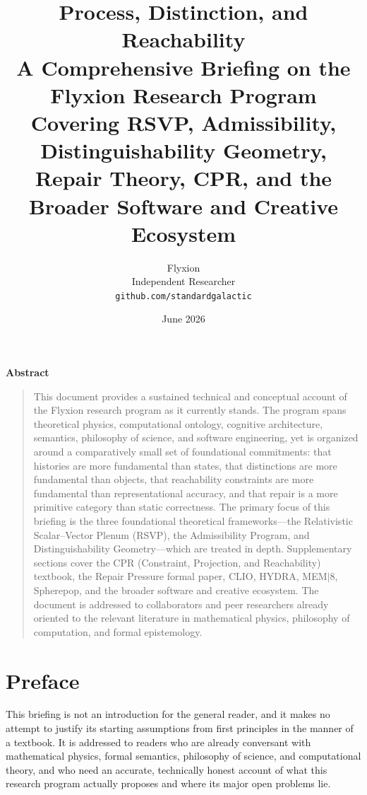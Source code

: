 \documentclass[11pt, oneside]{book}
\title{%
  \textbf{Process, Distinction, and Reachability}\\[0.6em]
  \large A Comprehensive Briefing on the Flyxion Research Program\\[0.3em]
  \normalsize Covering RSVP, Admissibility, Distinguishability Geometry,\\
  Repair Theory, CPR, and the Broader Software and Creative Ecosystem
}
\author{Flyxion \\ \small Independent Researcher \\ \small \texttt{github.com/standardgalactic}}
\date{June 2026}
\theoremstyle{definition}
\theoremstyle{remark}
\begin{document}
\frontmatter
\maketitle
\thispagestyle{empty}

\vspace{2em}
\begin{center}
\large\textbf{Abstract}
\end{center}
\begin{quote}
\noindent
This document provides a sustained technical and conceptual account of the Flyxion research program as it currently stands. The program spans theoretical physics, computational ontology, cognitive architecture, semantics, philosophy of science, and software engineering, yet is organized around a comparatively small set of foundational commitments: that histories are more fundamental than states, that distinctions are more fundamental than objects, that reachability constraints are more fundamental than representational accuracy, and that repair is a more primitive category than static correctness. The primary focus of this briefing is the three foundational theoretical frameworks—the Relativistic Scalar–Vector Plenum (RSVP), the Admissibility Program, and Distinguishability Geometry—which are treated in depth. Supplementary sections cover the CPR (Constraint, Projection, and Reachability) textbook, the Repair Pressure formal paper, CLIO, HYDRA, MEM$|$8, Spherepop, and the broader software and creative ecosystem. The document is addressed to collaborators and peer researchers already oriented to the relevant literature in mathematical physics, philosophy of computation, and formal epistemology.
\end{quote}

\vspace{2em}
\tableofcontents

\chapter*{Preface}

This briefing is not an introduction for the general reader, and it makes no attempt to justify its starting assumptions from first principles in the manner of a textbook. It is addressed to readers who are already conversant with mathematical physics, formal semantics, philosophy of science, and computational theory, and who need an accurate, technically honest account of what this research program actually proposes and where its major open problems lie.
\end{document}
